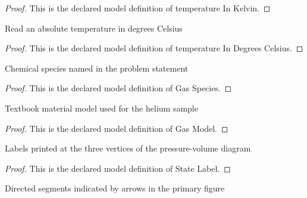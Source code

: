 \begin{proof}
  This is the declared model definition of temperature In Kelvin.
\end{proof}
\begin{definition}
  \label{def:physics:phyx-mini-0414:phyxminiproblems-problemphyxmini0414-temperatureindegreescelsius}
  Read an absolute temperature in degrees Celsius
\end{definition}
\begin{proof}
  This is the declared model definition of temperature In Degrees Celsius.
\end{proof}
\begin{definition}
  \label{def:physics:phyx-mini-0414:phyxminiproblems-problemphyxmini0414-gasspecies}
  Chemical species named in the problem statement
\end{definition}
\begin{proof}
  This is the declared model definition of Gas Species.
\end{proof}
\begin{definition}
  \label{def:physics:phyx-mini-0414:phyxminiproblems-problemphyxmini0414-gasmodel}
  Textbook material model used for the helium sample
\end{definition}
\begin{proof}
  This is the declared model definition of Gas Model.
\end{proof}
\begin{definition}
  \label{def:physics:phyx-mini-0414:phyxminiproblems-problemphyxmini0414-statelabel}
  Labels printed at the three vertices of the pressure-volume diagram
\end{definition}
\begin{proof}
  This is the declared model definition of State Label.
\end{proof}
\begin{definition}
  \label{def:physics:phyx-mini-0414:phyxminiproblems-problemphyxmini0414-cyclesegment}
  Directed segments indicated by arrows in the primary figure
\end{definition}
